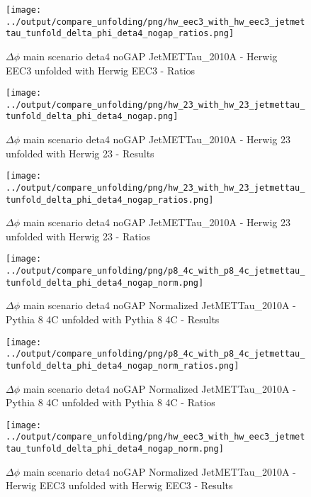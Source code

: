\documentclass[11pt]{book}
\begin{document}
\begin{figure}[ht]
\centering
\texttt{[image: ../output/compare\_unfolding/png/hw\_eec3\_with\_hw\_eec3\_jetmettau\_tunfold\_delta\_phi\_deta4\_nogap\_ratios.png]}
\caption{$\Delta\phi$ main scenario deta4 noGAP JetMETTau\_2010A - Herwig EEC3 unfolded with Herwig EEC3 - Ratios}
\label{hw_eec3_hw_eec3_jetmettau_tunfold_delta_phi_deta4_nogap_b}
\end{figure}

\begin{figure}[ht]
\centering
\texttt{[image: ../output/compare\_unfolding/png/hw\_23\_with\_hw\_23\_jetmettau\_tunfold\_delta\_phi\_deta4\_nogap.png]}
\caption{$\Delta\phi$ main scenario deta4 noGAP JetMETTau\_2010A - Herwig 23 unfolded with Herwig 23 - Results}
\label{hw_23_hw_23_jetmettau_tunfold_delta_phi_deta4_nogap_a}
\end{figure}

\begin{figure}[ht]
\centering
\texttt{[image: ../output/compare\_unfolding/png/hw\_23\_with\_hw\_23\_jetmettau\_tunfold\_delta\_phi\_deta4\_nogap\_ratios.png]}
\caption{$\Delta\phi$ main scenario deta4 noGAP JetMETTau\_2010A - Herwig 23 unfolded with Herwig 23 - Ratios}
\label{hw_23_hw_23_jetmettau_tunfold_delta_phi_deta4_nogap_b}
\end{figure}



\begin{figure}[ht]
\centering
\texttt{[image: ../output/compare\_unfolding/png/p8\_4c\_with\_p8\_4c\_jetmettau\_tunfold\_delta\_phi\_deta4\_nogap\_norm.png]}
\caption{$\Delta\phi$ main scenario deta4 noGAP Normalized JetMETTau\_2010A - Pythia 8 4C unfolded with Pythia 8 4C - Results}
\label{p8_p8_jetmettau_tunfold_delta_phi_deta4_nogap_norm_a}
\end{figure}

\begin{figure}[ht]
\centering
\texttt{[image: ../output/compare\_unfolding/png/p8\_4c\_with\_p8\_4c\_jetmettau\_tunfold\_delta\_phi\_deta4\_nogap\_norm\_ratios.png]}
\caption{$\Delta\phi$ main scenario deta4 noGAP Normalized JetMETTau\_2010A - Pythia 8 4C unfolded with Pythia 8 4C - Ratios}
\label{p8_p8_jetmettau_tunfold_delta_phi_deta4_nogap_norm_b}
\end{figure}

\begin{figure}[ht]
\centering
\texttt{[image: ../output/compare\_unfolding/png/hw\_eec3\_with\_hw\_eec3\_jetmettau\_tunfold\_delta\_phi\_deta4\_nogap\_norm.png]}
\caption{$\Delta\phi$ main scenario deta4 noGAP Normalized JetMETTau\_2010A - Herwig EEC3 unfolded with Herwig EEC3 - Results}
\label{hw_eec3_hw_eec3_jetmettau_tunfold_delta_phi_deta4_nogap_norm_a}
\end{figure}
\end{document}

